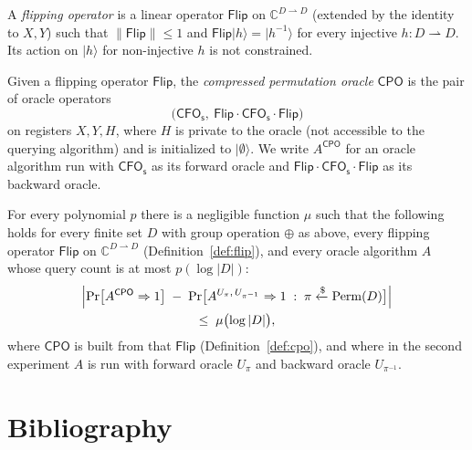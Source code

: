 \documentclass{aicr-conjecture}
\newcommand{\ket}[1]{|#1\rangle}
\newcommand{\pto}{\rightharpoonup}
\newcommand{\Perm}{\mathrm{Perm}}
\newcommand{\CC}{\mathbb{C}}
\newcommand{\CFOs}{\mathsf{CFO_s}}
\newcommand{\Flip}{\mathsf{Flip}}
\newcommand{\CPO}{\mathsf{CPO}}
\begin{document}
\begin{definition}\label{def:flip}
A \emph{flipping operator} is a linear operator $\Flip$ on
$\CC^{D \pto D}$ (extended by the identity to $X, Y$) such that
$\|\Flip\| \le 1$ and $\Flip\ket{h} = \ket{h^{-1}}$ for every injective
$h : D \pto D$. Its action on $\ket{h}$ for non-injective $h$ is not
constrained.
\end{definition}

\begin{definition}\label{def:cpo}
Given a flipping operator $\Flip$, the \emph{compressed permutation
oracle} $\CPO$ is the pair of oracle operators
\[
  \bigl( \CFOs,\ \Flip \cdot \CFOs \cdot \Flip \bigr)
\]
on registers $X, Y, H$, where $H$ is private to the oracle (not
accessible to the querying algorithm) and is initialized to
$\ket{\emptyset}$. We write $A^{\CPO}$ for an oracle algorithm run
with $\CFOs$ as its forward oracle and $\Flip \cdot \CFOs \cdot \Flip$
as its backward oracle.
\end{definition}

\begin{conjecture}[soundness of $\CPO$]\label{conj:main}
For every polynomial $p$ there is a negligible function $\mu$ such that
the following holds for every finite set $D$ with group operation
$\oplus$ as above, every flipping operator $\Flip$ on
$\CC^{D \pto D}$ (Definition~\ref{def:flip}), and every oracle
algorithm $A$ whose query count is at most $p(\log |D|)$:
\begin{multline*}
  \Bigl| \Pr\bigl[ A^{\CPO} \Rightarrow 1 \bigr] \;-\;
  \Pr\bigl[ A^{U_\pi,\, U_{\pi^{-1}}} \Rightarrow 1 \;:\;
    \pi \xleftarrow{\$} \Perm(D) \bigr] \Bigr| \\
  \le\; \mu\bigl(\log |D|\bigr),
\end{multline*}
where $\CPO$ is built from that $\Flip$ (Definition~\ref{def:cpo}), and
where in the second experiment $A$ is run with forward oracle $U_\pi$
and backward oracle $U_{\pi^{-1}}$.
\end{conjecture}

\section{Bibliography}
\end{document}
